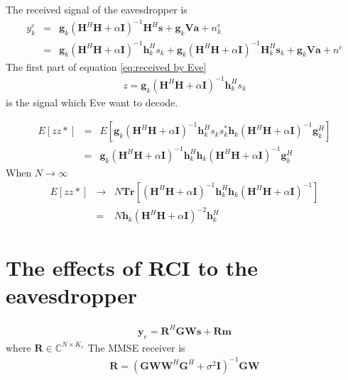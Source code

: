 \documentclass[12pt,journal,draftclsnofoot,onecolumn]{IEEEtran}
\begin{document}
The received signal of the eavesdropper is
\begin{eqnarray}
y_k^e &=& \mathbf{g}_k\left(\mathbf{H}^H\mathbf{H} + \alpha \mathbf{I}\right)^{-1}\mathbf{H}^H\mathbf{s} +\mathbf{g}_k\mathbf{V}\mathbf{a} + n^e_k\\
&=&\mathbf{g}_k\left(\mathbf{H}^H\mathbf{H} + \alpha \mathbf{I}\right)^{-1}\mathbf{h}_k^Hs_k + \mathbf{g}_k\left(\mathbf{H}^H\mathbf{H} + \alpha \mathbf{I}\right)^{-1}\mathbf{H}_k^H\mathbf{s}_k + \mathbf{g}_k\mathbf{V}\mathbf{a} + n^e \label{eq:received by Eve}
\end{eqnarray}
The first part of equation \eqref{eq:received by Eve} 
\begin{eqnarray}
z = \mathbf{g}_k\left(\mathbf{H}^H\mathbf{H} + \alpha \mathbf{I}\right)^{-1}\mathbf{h}_k^Hs_k
\end{eqnarray}
is the signal which Eve want to decode. 

\begin{eqnarray}
E[zz*] &=& E\left[\mathbf{g}_k\left(\mathbf{H}^H\mathbf{H} + \alpha \mathbf{I}\right)^{-1}\mathbf{h}_k^Hs_ks_k^*\mathbf{h}_k\left(\mathbf{H}^H\mathbf{H} + \alpha \mathbf{I}\right)^{-1}\mathbf{g}_k^H\right]\\
&=&\mathbf{g}_k\left(\mathbf{H}^H\mathbf{H} + \alpha \mathbf{I}\right)^{-1}\mathbf{h}_k^H\mathbf{h}_k\left(\mathbf{H}^H\mathbf{H} + \alpha \mathbf{I}\right)^{-1}\mathbf{g}_k^H
\end{eqnarray}
When $N \to \infty$
\begin{eqnarray}
E[zz*] &\to& N\mathbf{Tr}\left[\left(\mathbf{H}^H\mathbf{H} + \alpha \mathbf{I}\right)^{-1}\mathbf{h}_k^H\mathbf{h}_k\left(\mathbf{H}^H\mathbf{H} + \alpha \mathbf{I}\right)^{-1}\right]\\
&=&N\mathbf{h}_k\left(\mathbf{H}^H\mathbf{H} + \alpha \mathbf{I}\right)^{-2}\mathbf{h}_k^H
\end{eqnarray}


\section{The effects of RCI to the eavesdropper}
\begin{eqnarray}
\mathbf{y}_e = \mathbf{R}^H\mathbf{G}\mathbf{W}\mathbf{s}+\mathbf{R}\mathbf{m}
\end{eqnarray}
where $\mathbf{R} \in \mathbb{C}^{N \times K_e}$
The MMSE receiver is
\begin{eqnarray}
\mathbf{R} = \left(\mathbf{G}\mathbf{W}\mathbf{W}^H\mathbf{G}^H + \sigma^2\mathbf{I}\right)^{-1}\mathbf{G}\mathbf{W}	
\end{eqnarray}
\end{document}
